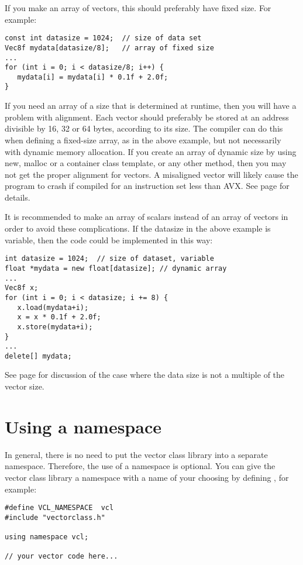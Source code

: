 \documentclass[vcl_manual.tex]{subfiles}
\begin{document}
If you make an array of vectors, this should preferably have fixed size. For example:
\begin{lstlisting}[frame=none]
const int datasize = 1024;  // size of data set
Vec8f mydata[datasize/8];   // array of fixed size
...
for (int i = 0; i < datasize/8; i++) {
   mydata[i] = mydata[i] * 0.1f + 2.0f;
}
\end{lstlisting}

If you need an array of a size that is determined at runtime, then you will have a problem with alignment. Each vector should preferably be stored at an address divisible by 16, 32 or 64 bytes, according to its size. The compiler can do this when defining a fixed-size array, as in the above example, but not necessarily with dynamic memory allocation. If you create an array of dynamic size by using new, malloc or a container class template, or any other method, then you may not get the proper alignment for vectors.
A misaligned vector will likely cause the program to crash if compiled for an instruction set less than AVX. See page \pageref{Alignment} for details.

It is recommended to make an array of scalars instead of an array of vectors in order to avoid these complications. If the datasize in the above example is variable, then the code could be implemented in this way:

\begin{lstlisting}[frame=none]
int datasize = 1024;  // size of dataset, variable
float *mydata = new float[datasize]; // dynamic array
...
Vec8f x;
for (int i = 0; i < datasize; i += 8) {
   x.load(mydata+i);
   x = x * 0.1f + 2.0f;
   x.store(mydata+i);
}
...
delete[] mydata;
\end{lstlisting}

See page \pageref{NotAMultipleOfVectorSize} for discussion of the case where the data size is not a multiple of the vector size.

\section{Using a namespace} \label{UsingANamespace}

In general, there is no need to put the vector class library into a separate namespace. Therefore, the use of a namespace is optional. You can give the vector class library a namespace with a name of your choosing by defining , for example:

\begin{lstlisting}[frame=single]
#define VCL_NAMESPACE  vcl
#include "vectorclass.h"

using namespace vcl;

// your vector code here...
\end{lstlisting}
\end{document}
